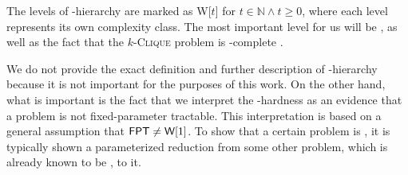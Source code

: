 The levels of \W-hierarchy are marked as \textsf{W}[$t$] for $t \in \mathbb{N} \wedge t \geq 0$,
where each level represents its own complexity class.
The most important level for us will be \Wone,
as well as the fact that the $k$-\textsc{Clique} problem is \Wone-complete \cite{Downey1999}.

We do not provide the exact definition and further description of \W-hierarchy
because it is not important for the purposes of this work.
On the other hand, what is important is the fact that we interpret the \W-hardness as an evidence that
a problem is not fixed-parameter tractable.
This interpretation is based on a general assumption that $\textsf{FPT} \neq \textsf{W}[1]$.
To show that a certain problem is \Wh, it is typically shown a parameterized reduction from some other problem,
which is already known to be \Wh, to it.
